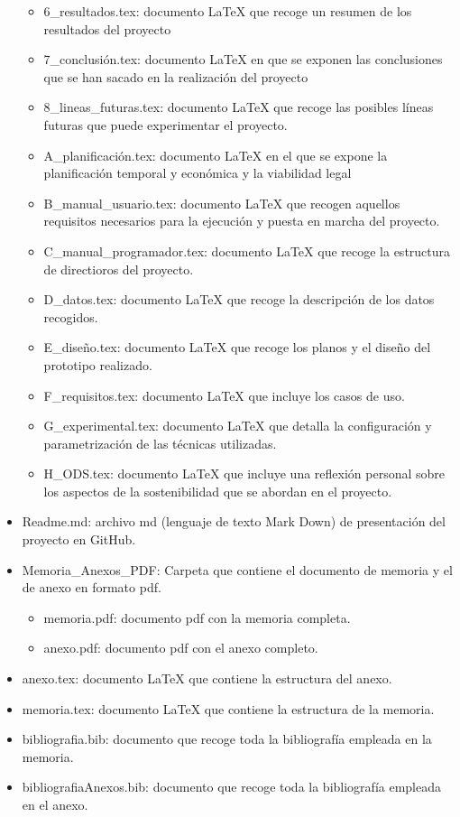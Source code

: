 \begin{itemize}
\begin{itemize}
        \item 6\_resultados.tex: documento LaTeX que recoge un resumen de los resultados del proyecto
        \item 7\_conclusión.tex: documento LaTeX en que se exponen las conclusiones que se han sacado en la realización del proyecto
        \item 8\_lineas\_futuras.tex: documento LaTeX que recoge las posibles líneas futuras que puede experimentar el proyecto.
        \item A\_planificación.tex: documento LaTeX en el que se expone la planificación temporal y económica y la viabilidad legal
        \item B\_manual\_usuario.tex: documento LaTeX que recogen aquellos requisitos necesarios para la ejecución y puesta en marcha del proyecto.
        \item C\_manual\_programador.tex: documento LaTeX que recoge la estructura de directioros del proyecto.
        \item D\_datos.tex: documento LaTeX que recoge la descripción de los datos recogidos.
        \item E\_diseño.tex: documento LaTeX que recoge los planos y el diseño del prototipo realizado.
        \item F\_requisitos.tex: documento LaTeX que incluye los casos de uso.
        \item G\_experimental.tex: documento LaTeX que detalla la configuración y parametrización de las técnicas utilizadas.
        \item H\_ODS.tex: documento LaTeX que incluye una reflexión personal sobre los aspectos de la sostenibilidad que se abordan en el proyecto.
    \end{itemize}
    \item Readme.md: archivo md (lenguaje de texto Mark Down) de presentación del proyecto en GitHub.
    \item Memoria\_Anexos\_PDF: Carpeta que contiene el documento de memoria y el de anexo en formato pdf.
    \begin{itemize}
        \item memoria.pdf: documento pdf con la memoria completa.
        \item anexo.pdf: documento pdf con el anexo completo.
    \end{itemize}
    \item anexo.tex: documento LaTeX que contiene la estructura del anexo.
    \item memoria.tex: documento LaTeX que contiene la estructura de la memoria.
    \item bibliografia.bib: documento que recoge toda la bibliografía empleada en la memoria.
    \item bibliografiaAnexos.bib: documento que recoge toda la bibliografía empleada en el anexo.
\end{itemize}
